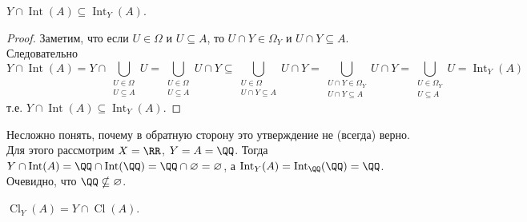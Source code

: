 \documentclass[12pt,a4paper]{article}
\DeclareMathOperator{\Cl}{Cl}
\DeclareMathOperator{\Int}{Int}
\begin{document}
    \begin{problem}{20}
        \begin{lemma}
            $Y \cap \Int(A) \subseteq \Int_Y(A)$.
        \end{lemma}

        \begin{proof}
            Заметим, что если $U \in \Omega$ и $U \subseteq A$, то $U \cap Y \in \Omega_Y$ и $U \cap Y \subseteq A$. Следовательно
            \[
                Y \cap \Int(A)
                = Y \cap \bigcup_{\substack{U \in \Omega\\U \subseteq A}} U
                = \bigcup_{\substack{U \in \Omega\\U \subseteq A}} U \cap Y
                \subseteq \bigcup_{\substack{U \in \Omega\\U \cap Y \subseteq A}} U \cap Y
                = \bigcup_{\substack{U \cap Y \in \Omega_Y\\U \cap Y \subseteq A}} U \cap Y
                = \bigcup_{\substack{U \in \Omega_Y\\U \subseteq A}} U
                = \Int_Y(A)
            \]
            т.е. $Y \cap \Int(A) \subseteq \Int_Y(A)$.
        \end{proof}

        Несложно понять, почему в обратную сторону это утверждение не (всегда) верно. Для этого рассмотрим $X = \RR$, $Y = A = \QQ$. Тогда $Y \cap \Int(A) = \QQ \cap \Int(\QQ) = \QQ \cap \varnothing = \varnothing$, а $\Int_Y(A) = \Int_{\QQ}(\QQ) = \QQ$. Очевидно, что $\QQ \nsubseteq \varnothing$.

        \begin{lemma}
            $\Cl_Y(A) = Y \cap \Cl(A)$.
        \end{lemma}


\end{problem}
\end{document}
